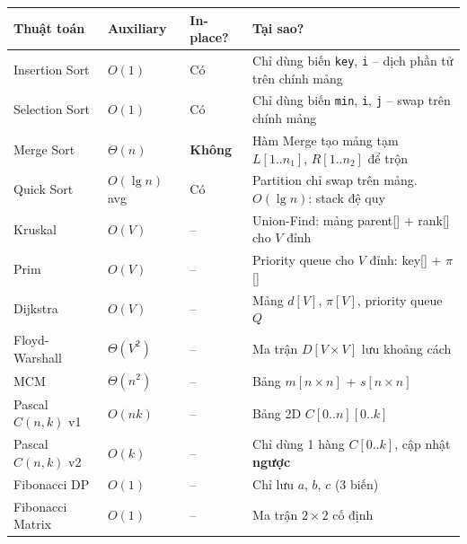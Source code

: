 \documentclass[10pt]{article}
\newcounter{none}
\begin{document}
{\def\LTcaptype{none}
\begin{longtable}[]{@{}
  >{\raggedright\arraybackslash}p{}
  >{\raggedright\arraybackslash}p{}
  >{\raggedright\arraybackslash}p{}
  >{\raggedright\arraybackslash}p{}@{}}
\toprule\noalign{}
\begin{minipage}[b]{\linewidth}\raggedright
Thuật toán
\end{minipage} & \begin{minipage}[b]{\linewidth}\raggedright
Auxiliary
\end{minipage} & \begin{minipage}[b]{\linewidth}\raggedright
In-place?
\end{minipage} & \begin{minipage}[b]{\linewidth}\raggedright
Tại sao?
\end{minipage} \\
\midrule\noalign{}
\endhead
\bottomrule\noalign{}
\endlastfoot
Insertion Sort & $O(1)$ & Có & Chỉ dùng biến \texttt{key}, \texttt{i} -- dịch phần tử trên chính mảng \\
Selection Sort & $O(1)$ & Có & Chỉ dùng biến \texttt{min}, \texttt{i}, \texttt{j} -- swap trên chính mảng \\
Merge Sort & $\Theta(n)$ & \textbf{Không} & Hàm Merge tạo mảng tạm $L[1..n_1]$, $R[1..n_2]$ để trộn \\
Quick Sort & $O(\lg n)$ avg & Có & Partition chỉ swap trên mảng. $O(\lg n)$: stack đệ quy \\
Kruskal & $O(V)$ & -- & Union-Find: mảng parent[] + rank[] cho $V$ đỉnh \\
Prim & $O(V)$ & -- & Priority queue cho $V$ đỉnh: key[] + $\pi$[] \\
Dijkstra & $O(V)$ & -- & Mảng $d[V]$, $\pi[V]$, priority queue $Q$ \\
Floyd-Warshall & $\Theta(V^2)$ & -- & Ma trận $D[V \times V]$ lưu khoảng cách \\
MCM & $\Theta(n^2)$ & -- & Bảng $m[n \times n]$ + $s[n \times n]$ \\
Pascal $C(n,k)$ v1 & $O(nk)$ & -- & Bảng 2D $C[0..n][0..k]$ \\
Pascal $C(n,k)$ v2 & $O(k)$ & -- & Chỉ dùng 1 hàng $C[0..k]$, cập nhật \textbf{ngược} \\
Fibonacci DP & $O(1)$ & -- & Chỉ lưu $a$, $b$, $c$ (3 biến) \\
Fibonacci Matrix & $O(1)$ & -- & Ma trận $2 \times 2$ cố định \\
\end{longtable}
}
\label{tab:space-complexity}
\end{document}
